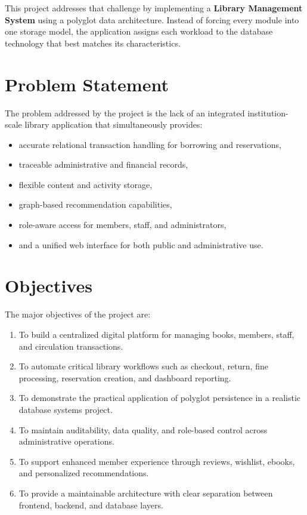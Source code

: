 \documentclass[12pt,a4paper]{report}
\begin{document}
This project addresses that challenge by implementing a \textbf{Library Management System} using a polyglot data architecture. Instead of forcing every module into one storage model, the application assigns each workload to the database technology that best matches its characteristics.

\section{Problem Statement}
The problem addressed by the project is the lack of an integrated institution-scale library application that simultaneously provides:
\begin{itemize}[leftmargin=1.5em]
    \item accurate relational transaction handling for borrowing and reservations,
    \item traceable administrative and financial records,
    \item flexible content and activity storage,
    \item graph-based recommendation capabilities,
    \item role-aware access for members, staff, and administrators,
    \item and a unified web interface for both public and administrative use.
\end{itemize}

\section{Objectives}
The major objectives of the project are:
\begin{enumerate}[leftmargin=1.5em]
    \item To build a centralized digital platform for managing books, members, staff, and circulation transactions.
    \item To automate critical library workflows such as checkout, return, fine processing, reservation creation, and dashboard reporting.
    \item To demonstrate the practical application of polyglot persistence in a realistic database systems project.
    \item To maintain auditability, data quality, and role-based control across administrative operations.
    \item To support enhanced member experience through reviews, wishlist, ebooks, and personalized recommendations.
    \item To provide a maintainable architecture with clear separation between frontend, backend, and database layers.
\end{enumerate}
\end{document}
